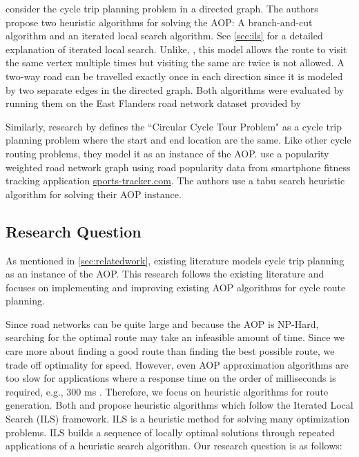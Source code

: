 \documentclass[honors]{union-cs-thesis}
\begin{document}
\citeauthor{verbeeck2014extension} \cite{verbeeck2014extension} consider the cycle trip planning problem in a directed graph. The authors propose two heuristic algorithms for solving the AOP: A branch-and-cut algorithm and an iterated local search algorithm. See \cref{sec:ils} for a detailed explanation of iterated local search. Unlike, \citeauthor{souffriau2011planning}, this model allows the route to visit the same vertex multiple times but visiting the same arc twice is not allowed. A two-way road can be travelled exactly once in each direction since it is modeled by two separate edges in the directed graph.  Both algorithms were evaluated by running them on the East Flanders road network dataset provided by \citeauthor{souffriau2011planning}

Similarly, research by \citeauthor{bergman2015optimization} \cite{bergman2015optimization} defines the ``Circular Cycle Tour Problem" as a cycle trip planning problem where the start and end location are the same. Like other cycle routing problems, they model it as an instance of the AOP. \citeauthor{bergman2015optimization} use a popularity weighted road network graph using road popularity data from smartphone fitness tracking application \href{http://www.sports-tracker.com/}{\url{sports-tracker.com}}. The authors use a tabu search heuristic algorithm for solving their AOP instance.


\subsection{Research Question}
As mentioned in \cref{sec:relatedwork}, existing literature models cycle trip planning as an instance of the AOP. This research follows the existing literature and focuses on implementing and improving existing AOP algorithms for cycle route planning. 

Since road networks can be quite large and because the AOP is NP-Hard, searching for the optimal route may take an infeasible amount of time. Since we care more about finding a good route than finding the best possible route, we trade off optimality for speed. However, even AOP approximation algorithms are too slow for applications where a response time on the order of milliseconds is required, e.g., 300 ms \cite{lu2015arc}. Therefore, we focus on heuristic algorithms for route generation. Both \citeauthor{verbeeck2014extension} and \citeauthor{lu2015arc} propose heuristic algorithms which follow the Iterated Local Search (ILS) framework. ILS is a heuristic method for solving many optimization problems. ILS builds a sequence of locally optimal solutions through repeated applications of a heuristic search algorithm. Our research question is as follows:
\end{document}
